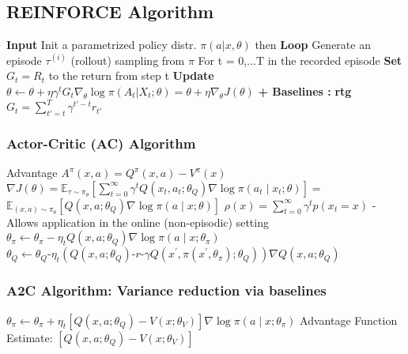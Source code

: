 \documentclass[a4paper, 11pt, landscape]{article}
\begin{document}
\begin{multicols*}{3}
\section{REINFORCE Algorithm}
\textbf{Input} Init a parametrized policy distr. $\pi(a|x,\theta)$ then \textbf{Loop }
\newline Generate an episode  $\tau^{(i)}$ (rollout) sampling from $\pi$
\newline For t = 0,...T in the recorded episode
\newline \textbf{Set} $G_t = R_t$ to the return from step t 
\newline \textbf{Update} $\theta \leftarrow \theta + \eta \gamma^t G_t \nabla_{\theta}\log \pi(A_t
|X_t;\theta) = \theta + \eta \nabla_{\theta}J(\theta) $
\newline \textbf{+ Baselines :} \textbf{rtg} $G_t = \sum _{t' = t}^T  \gamma ^ {t'-t}r_{t'} $

\subsubsection{Actor-Critic (AC) Algorithm}
Advantage $A^{\pi}(x, a)=Q^{\pi}(x, a)-V^{\pi}(x)$
\newline $\nabla J(\theta)=\mathbb{E}_{\tau \sim \pi_{\theta}}\left[\sum_{t=0}^{\infty} \gamma^{t} Q\left(x_{t}, a_{t} ; \theta_{Q}\right) \nabla \log \pi\left(a_{t} \mid x_{t} ; \theta\right)\right] =$
\newline $\mathbb{E}_{(x, a) \sim \pi_{\theta}}\left[Q\left(x, a ; \theta_{Q}\right) \nabla \log \pi(a \mid x ; \theta)\right]$
\newline $\rho(x)=\sum_{t=0}^{\infty} \gamma^{t} p\left(x_{t}=x\right)$
\newline - Allows application in the online (non-episodic) setting
\newline $\theta_{\pi} \leftarrow \theta_{\pi}-\eta_{t} Q\left(x, a ; \theta_{Q}\right) \nabla \log \pi\left(a \mid x ; \theta_{\pi}\right)$
\newline $\theta_{Q} \leftarrow \theta_{Q}\text{-}\eta_{t}\left(Q\left(x, a ; \theta_{Q}\right)\text{-}r\text{-}\gamma Q\left(x^{\prime}, \pi\left(x^{\prime}, \theta_{\pi}\right) ; \theta_{Q}\right)\right) \nabla Q\left(x, a ; \theta_{Q}\right)$

\subsubsection{A2C Algorithm: Variance reduction via baselines}
$\theta_{\pi} \leftarrow \theta_{\pi}+\eta_{t}\left[Q\left(x, a ; \theta_{Q}\right)-V\left(x ; \theta_{V}\right)\right] \nabla \log \pi\left(a \mid x ; \theta_{\pi}\right)$
\newline Advantage Function Estimate: $ \left[Q\left(x, a ; \theta_{Q}\right)-V\left(x ; \theta_{V}\right)\right] $


\end{multicols*}
\end{document}
